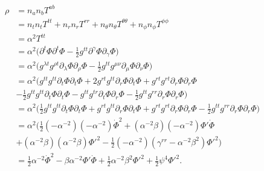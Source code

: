 \documentclass[12pt]{article}
\numberwithin{equation}{section}
\begin{document}
\begin{equation}
\begin{aligned}
\rho &= n_a n_b T^{ab} \\
&= n_t n_t T^{tt} + n_r n_r T^{rr} + n_\theta n_\theta T^{\theta \theta} + n_\phi n_\phi T^{\phi \phi} \\
&= \alpha^{2} T^{tt} \\
&= \alpha^{2} \Big( \partial^t \Phi \partial^t \Phi - \frac{1}{2} g^{t t} \partial^\gamma \Phi \partial_\gamma \Phi \Big) \\
&= \alpha^{2} \Big( g^{\lambda t} g^{\rho t} \partial_\lambda \Phi \partial_\rho \Phi - \frac{1}{2} g^{t t} g^{\mu \nu} \partial_{\mu} \Phi \partial_{\nu} \Phi \Big) \\
&= \alpha^{2} \Big( g^{t t} g^{t t} \partial_t \Phi \partial_t \Phi + 2 g^{r t} g^{t t} \partial_r \Phi \partial_t \Phi + g^{r t} g^{r t} \partial_r \Phi \partial_r \Phi \\
&- \frac{1}{2} g^{t t} g^{t t} \partial_{t} \Phi \partial_{t} \Phi - g^{t t} g^{t r} \partial_{t} \Phi \partial_{r} \Phi - \frac{1}{2} g^{t t} g^{r r} \partial_{r} \Phi \partial_{r} \Phi \Big) \\
&= \alpha^{2} \Big( \frac{1}{2} g^{t t} g^{t t} \partial_t \Phi \partial_t \Phi + g^{r t} g^{t t} \partial_r \Phi \partial_t \Phi + g^{r t} g^{r t} \partial_r \Phi \partial_r \Phi - \frac{1}{2} g^{t t} g^{r r} \partial_{r} \Phi \partial_{r} \Phi \Big) \\
&= \alpha^{2} \Big( \frac{1}{2} (-\alpha^{-2}) (-\alpha^{-2}) \dot{\Phi}^2 + (\alpha^{-2} \beta) (-\alpha^{-2}) \Phi' \dot{\Phi} \\
&+ (\alpha^{-2} \beta) (\alpha^{-2} \beta) \Phi'^2 - \frac{1}{2} (-\alpha^{-2}) (\gamma^{rr} - \alpha^{-2} \beta^2) \Phi'^2 \Big) \\
&= \frac{1}{2} \alpha^{-2} \dot{\Phi}^2 - \beta \alpha^{-2} \Phi' \dot{\Phi} + \frac{1}{2} \alpha^{-2} \beta^2 \Phi'^2 + \frac{1}{2} \psi^4 \Phi'^2. \\
\end{aligned}
\end{equation}
\end{document}
